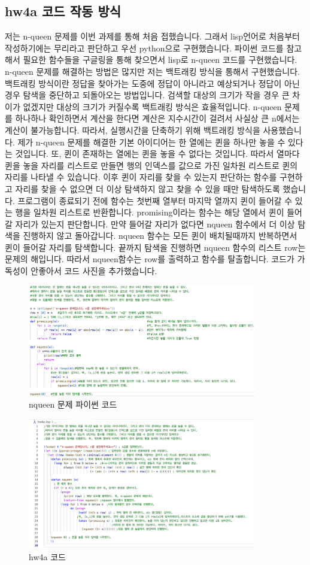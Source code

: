 \documentclass{article}
\begin{document}
\subsection{hw4a 코드 작동 방식}
저는 n-queen 문제를 이번 과제를 통해 처음 접했습니다. 그래서 lisp언어로 처음부터 작성하기에는 무리라고 판단하고 우선 python으로 구현했습니다. 파이썬 코드를 참고해서 필요한 함수들을 구글링을 통해 찾으면서 lisp로 n-queen 코드를 구현했습니다. n-queen 문제를 해결하는 방법은 많지만 저는 백트래킹 방식을 통해서 구현했습니다. 백트래킹 방식이란 정답을 찾아가는 도중에 정답이 아니라고 예상되거나 정답이 아닌경우 탐색을 중단하고 되돌아오는 방법입니다. 검색할 대상의 크기가 작을 경우 큰 차이가 없겠지만 대상의 크기가 커질수록 백트래킹 방식은 효율적입니다. n-queen 문제를 하나하나 확인하면서 계산을 한다면 계산은 지수시간이 걸려서 사실상 큰 n에서는 계산이 불가능합니다. 따라서, 실행시간을 단축하기 위해 백트래킹 방식을 사용했습니다. 제가 n-queen 문제를 해결한 기본 아이디어는 한 열에는 퀸을 하나만 놓을 수 있다는 것입니다. 또, 퀸이 존재하는 열에는 퀸을 놓을 수 없다는 것입니다. 따라서 열마다 퀸을 놓을 자리를 리스트로 만들면 행의 인덱스를 값으로 가진 일차원 리스트로 퀸의 자리를 나타낼 수 있습니다. 이후 퀸이 자리를 찾을 수 있는지 판단하는 함수를 구현하고 자리를 찾을 수 없으면 더 이상 탐색하지 않고 찾을 수 있을 때만 탐색하도록 했습니다. 프로그램이 종료되기 전에 함수는 첫번째 열부터 마지막 열까지 퀸이 들어갈 수 있는 행을 일차원 리스트로 반환합니다. promising이라는 함수는 해당 열에서 퀸이 들어갈 자리가 있는지 판단합니다. 만약 들어갈 자리가 없다면 nqueen 함수에서 더 이상 탐색을 진행하지 않고 돌아갑니다. nqueen 함수는 모든 퀸이 배치될때까지 반복하면서 퀸이 들어갈 자리를 탐색합니다. 끝까지 탐색을 진행하면 nqueen 함수의 리스트 row는 문제의 해입니다. 따라서 nqueen함수는 row를 출력하고 함수를 탈출합니다. 코드가 가독성이 안좋아서 코드 사진을 추가했습니다. 
\newpage
\begin{figure}[h]
    \centering
    \includegraphics[width = 10cm]{nqueen_python.png}
    \caption{nqueen 문제 파이썬 코드}
    \label{fig:fig1}
\end{figure}
\begin{figure}[h]
    \centering
    \includegraphics[width = 10cm]{hw4a_code.png}
    \caption{hw4a 코드}
    \label{fig:fig2}
\end{figure}
\end{document}
